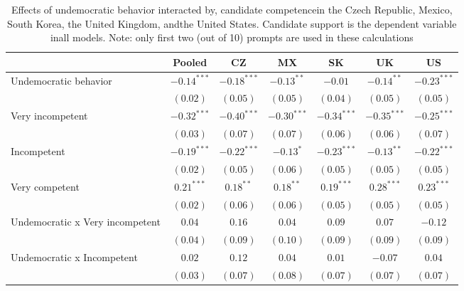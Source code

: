 
\begin{table}[!htbp]
\caption{Effects of undemocratic behavior interacted by, candidate competencein the Czech Republic, Mexico, South Korea, the United Kingdom, andthe United States. Candidate support is the dependent variable inall models.  Note: only first two (out of 10) prompts are used in these calculations}
\begin{center}
\begin{tabular}{l c c c c c c}
\hline
 & Pooled & CZ & MX & SK & UK & US \\
\hline
Undemocratic behavior           & $-0.14^{***}$ & $-0.18^{***}$ & $-0.13^{**}$  & $-0.01$       & $-0.14^{**}$  & $-0.23^{***}$ \\
                                & $(0.02)$      & $(0.05)$      & $(0.05)$      & $(0.04)$      & $(0.05)$      & $(0.05)$      \\
Very incompetent                & $-0.32^{***}$ & $-0.40^{***}$ & $-0.30^{***}$ & $-0.34^{***}$ & $-0.35^{***}$ & $-0.25^{***}$ \\
                                & $(0.03)$      & $(0.07)$      & $(0.07)$      & $(0.06)$      & $(0.06)$      & $(0.07)$      \\
Incompetent                     & $-0.19^{***}$ & $-0.22^{***}$ & $-0.13^{*}$   & $-0.23^{***}$ & $-0.13^{**}$  & $-0.22^{***}$ \\
                                & $(0.02)$      & $(0.05)$      & $(0.06)$      & $(0.05)$      & $(0.05)$      & $(0.05)$      \\
Very competent                  & $0.21^{***}$  & $0.18^{**}$   & $0.18^{**}$   & $0.19^{***}$  & $0.28^{***}$  & $0.23^{***}$  \\
                                & $(0.02)$      & $(0.06)$      & $(0.06)$      & $(0.05)$      & $(0.05)$      & $(0.05)$      \\
Undemocratic x Very incompetent & $0.04$        & $0.16$        & $0.04$        & $0.09$        & $0.07$        & $-0.12$       \\
                                & $(0.04)$      & $(0.09)$      & $(0.10)$      & $(0.09)$      & $(0.09)$      & $(0.09)$      \\
Undemocratic x Incompetent      & $0.02$        & $0.12$        & $0.04$        & $0.01$        & $-0.07$       & $0.04$        \\
                                & $(0.03)$      & $(0.07)$      & $(0.08)$      & $(0.07)$      & $(0.07)$      & $(0.07)$      \\

\end{tabular}
\end{center}
\end{table}
